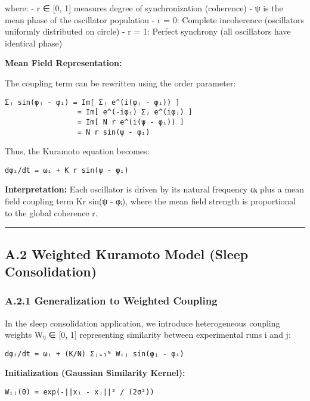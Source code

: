 \documentclass[
]{article}
\begin{document}
where: - r ∈ {[}0, 1{]} measures degree of synchronization (coherence) -
ψ is the mean phase of the oscillator population - r = 0: Complete
incoherence (oscillators uniformly distributed on circle) - r = 1:
Perfect synchrony (all oscillators have identical phase)

\textbf{Mean Field Representation:}

The coupling term can be rewritten using the order parameter:

\begin{verbatim}
Σⱼ sin(φⱼ - φᵢ) = Im[ Σⱼ e^(i(φⱼ - φᵢ)) ]
                 = Im[ e^(-iφᵢ) Σⱼ e^(iφⱼ) ]
                 = Im[ N r e^(i(ψ - φᵢ)) ]
                 = N r sin(ψ - φᵢ)
\end{verbatim}

Thus, the Kuramoto equation becomes:

\begin{verbatim}
dφᵢ/dt = ωᵢ + K r sin(ψ - φᵢ)
\end{verbatim}

\textbf{Interpretation:} Each oscillator is driven by its natural
frequency ωᵢ plus a mean field coupling term Kr sin(ψ - φᵢ), where the
mean field strength is proportional to the global coherence r.

\begin{center}\rule{0.5\linewidth}{0.5pt}\end{center}

\subsection{A.2 Weighted Kuramoto Model (Sleep
Consolidation)}\label{a.2-weighted-kuramoto-model-sleep-consolidation}

\subsubsection{A.2.1 Generalization to Weighted
Coupling}\label{a.2.1-generalization-to-weighted-coupling}

In the sleep consolidation application, we introduce heterogeneous
coupling weights Wᵢⱼ ∈ {[}0, 1{]} representing similarity between
experimental runs i and j:

\begin{verbatim}
dφᵢ/dt = ωᵢ + (K/N) Σⱼ₌₁ᴺ Wᵢⱼ sin(φⱼ - φᵢ)
\end{verbatim}

\textbf{Initialization (Gaussian Similarity Kernel):}

\begin{verbatim}
Wᵢⱼ(0) = exp(-||xᵢ - xⱼ||² / (2σ²))
\end{verbatim}
\end{document}

